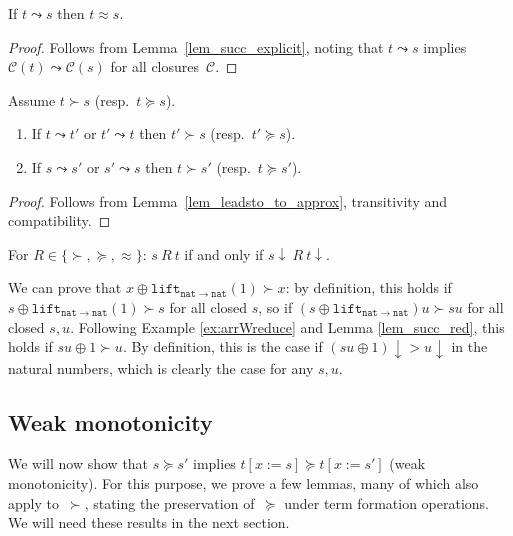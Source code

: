 \documentclass[a4paper,UKenglish,cleveref,autoref,numberwithinsect]{lipics-v2019}
\theoremstyle{definition}
\newcommand{\arrtype}{\rightarrow}
\newcommand{\subst}[2]{#1:=#2}
\newcommand{\arrW}{\leadsto}
\newcommand{\nat}{\mathtt{nat}}
\newcommand{\lift}{\mathtt{lift}}
\newcommand{\cl}{\mathcal{C}}
\begin{document}
\begin{lemma}\label{lem_leadsto_to_approx}
  If $t \arrW s$ then $t \approx s$.
\end{lemma}

\begin{proof}
  Follows from Lemma~\ref{lem_succ_explicit}, noting that $t \arrW s$
  implies $\cl(t) \arrW \cl(s)$ for all closures~$\cl$.
\end{proof}

\begin{lemma}\label{lem_succ_red}
  Assume $t \succ s$ (resp.~$t \succeq s$).
  \begin{enumerate}
  \item If $t \leadsto t'$ or $t' \leadsto t$ then $t' \succ s$
    (resp.~$t' \succeq s$).
  \item If $s \leadsto s'$ or $s' \leadsto s$ then $t \succ s'$
    (resp.~$t \succeq s'$).
  \end{enumerate}
\end{lemma}

\begin{proof}
  Follows from Lemma~\ref{lem_leadsto_to_approx}, transitivity and
  compatibility.
\end{proof}

\begin{corollary}\label{cor_succ_da}
  For $R \in \{\succ,\succeq,\approx\}$: $s\ R\ t$ if and only if
  $s\downarrow\ R\ t\downarrow$.
\end{corollary}

\begin{example}\label{ex:plus1}
We can prove that $x \oplus \lift_{\nat \arrtype \nat}(1)
\succ x$: by
definition, this holds if $s \oplus \lift_{\nat \arrtype \nat}(1) \succ
s$ for all closed $s$, so if $(s \oplus \lift_{\nat \arrtype \nat})u
\succ s u$ for all closed $s,u$.
Following Example \ref{ex:arrWreduce} and Lemma \ref{lem_succ_red},
this holds if $s u \oplus 1 \succ u$.  By definition, this is the
case if $(s u \oplus 1)\downarrow > u\downarrow$ in the natural numbers,
which is clearly the case for any $s,u$.
\end{example}

\subsection{Weak monotonicity}\label{subsec:weakmono}

We will now show that $s \succeq s'$ implies $t[\subst{x}{s}] \succeq
t[\subst{x}{s'}]$ (weak monotonicity).
For this purpose, we prove a few lemmas, many of
which also apply to~$\succ$, stating the preservation of~$\succeq$
under term formation operations. We will need these results in the next section.
\end{document}
